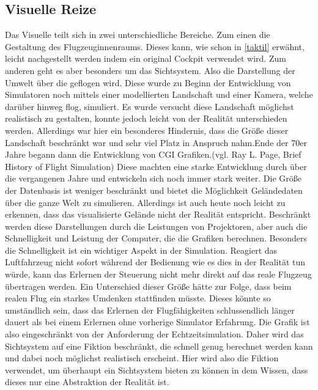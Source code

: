 \documentclass[12pt]{article}
\begin{document}
\subsection{Visuelle Reize}
Das Visuelle teilt sich in zwei unterschiedliche Bereiche. Zum einen die Gestaltung des Flugzeuginnenraums. Dieses kann, wie schon in \ref{taktil} erwähnt, leicht nachgestellt werden indem ein original Cockpit verwendet wird.\newline
Zum anderen geht es aber besonders um das Sichtsystem. Also die Darstellung der Umwelt über die geflogen wird. Diese wurde zu Beginn der Entwicklung von Simulatoren noch mittels einer modellierten Landschaft und einer Kamera, welche darüber hinweg flog, simuliert. Es wurde versucht diese Landschaft möglichst realistisch zu gestalten, konnte jedoch leicht von der Realität unterschieden werden. Allerdings war hier ein besonderes Hindernis, dass die Größe dieser Landschaft beschränkt war und sehr viel Platz in Anspruch nahm.\newline Ende der 70er Jahre begann dann die Entwicklung von CGI Grafiken.(vgl. Ray L. Page, Brief History of Flight Simulation)\newline
Diese machten eine starke Entwicklung durch über die vergangenen Jahre und entwickeln sich noch immer stark weiter. Die Größe der Datenbasis ist weniger beschränkt und bietet die Möglichkeit Geländedaten über die ganze Welt zu simulieren. Allerdings ist auch heute noch leicht zu erkennen, dass das visualisierte Gelände nicht der Realität entspricht. Beschränkt werden diese Darstellungen durch die Leistungen von Projektoren, aber auch die Schnelligkeit und Leistung der Computer, die die Grafiken berechnen. Besonders die Schnelligkeit ist ein wichtiger Aspekt in der Simulation. Reagiert das Luftfahrzeug nicht sofort während der Bedienung wie es dies in der Realität tun würde, kann das Erlernen der Steuerung nicht mehr direkt auf das reale Flugzeug übertragen werden. Ein Unterschied dieser Größe hätte zur Folge, dass beim realen Flug ein starkes Umdenken stattfinden müsste. Dieses könnte so umständlich sein, dass das Erlernen der Flugfähigkeiten schlussendlich länger dauert als bei einem Erlernen ohne vorherige Simulator Erfahrung.\newline
Die Grafik ist also eingeschränkt von der Anforderung der Echtzeitsimulation. Daher wird das Sichtsystem auf eine Fiktion beschränkt, die schnell genug berechnet werden kann und dabei noch möglichst realistisch erscheint. Hier wird also die Fiktion verwendet, um überhaupt ein Sichtsystem bieten zu können in dem Wissen, dass dieses nur eine Abstraktion der Realität ist.
\end{document}
